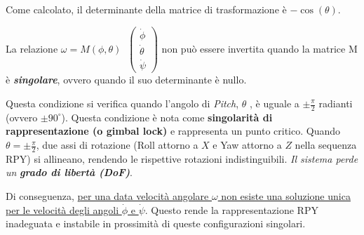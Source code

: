 \documentclass[11pt, a4paper]{article}
\begin{document}
\vspace{1em}
\begin{par}
\begin{flushleft}
Come calcolato, il determinante della matrice di trasformazione è $-\cos (\theta )$.
\end{flushleft}
\end{par}

\begin{par}
\begin{flushleft}
La relazione $\omega =M(\phi ,\theta )\;\;\left(\begin{array}{c}
\dot{\phi} \\
\dot{\theta} \\
\dot{\psi}
\end{array}\right)$ non può essere invertita quando la matrice M è \textit{\textbf{singolare}}, ovvero quando il suo determinante è nullo.
\end{flushleft}
\end{par}

\begin{par}
\begin{flushleft}
Questa condizione si verifica quando l'angolo di \textit{Pitch}, $\theta$ , è uguale a $\pm \frac{\pi }{2}$ radianti (ovvero $\pm 90^{\circ }$). Questa condizione è nota come \textbf{singolarità di rappresentazione (o gimbal lock)} e rappresenta un punto critico. Quando $\theta =\pm \frac{\pi }{2}$, due assi di rotazione (Roll attorno a $X$ e Yaw attorno a $Z$ nella sequenza RPY) si allineano, rendendo le rispettive rotazioni indistinguibili. \textit{Il sistema perde un }\textit{\textbf{grado di libertà (DoF)}}.
\end{flushleft}
\end{par}

\begin{par}
\begin{flushleft}
Di conseguenza, \underline{per una data velocità angolare $\omega$ non esiste una soluzione unica per le velocità degli angoli }$\dot{\phi}$\underline{ e }$\dot{\psi}$. Questo rende la rappresentazione RPY inadeguata e instabile in prossimità di queste configurazioni singolari.
\end{flushleft}
\end{par}
\end{document}
